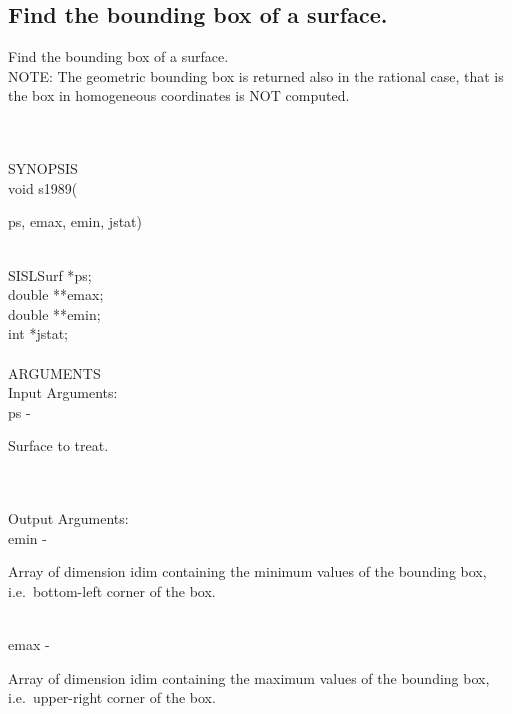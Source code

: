 \subsection{Find the bounding box of a surface.}
\begin{minipg1}
  Find the bounding box of a surface.\\
  NOTE: The geometric
  bounding box is returned also in the rational case, that
  is the box in homogeneous coordinates is NOT computed.
\end{minipg1} \\ \\
SYNOPSIS\\
        \>void s1989(\begin{minipg3}
          {\fov ps}, {\fov emax}, {\fov emin}, {\fov jstat})
        \end{minipg3}\\[0.3ex]
        \>\>    SISLSurf \> *{\fov ps};\\
        \>\>    double   \> **{\fov emax};\\
        \>\>    double   \> **{\fov emin};\\
        \>\>    int      \> *{\fov jstat};\\
\\
ARGUMENTS\\
        \>Input Arguments:\\
        \>\>    {\fov ps}\> - \>  \begin{minipg2}
                     Surface to treat.
                               \end{minipg2}\\
\\
        \>Output Arguments:\\
        \>\>    {\fov emin}\> - \>  \begin{minipg2}
                     Array of dimension {\fov idim} containing
                          the minimum values of the bounding box,
                          i.e.\ bottom-left corner of the box.
                               \end{minipg2}\\[0.8ex]
        \>\>    {\fov emax}\> - \>  \begin{minipg2}
                     Array of dimension {\fov idim} containing
                          the maximum values of the bounding box,
                          i.e.\ upper-right corner of the box.
                               \end{minipg2}\\[0.8ex]
